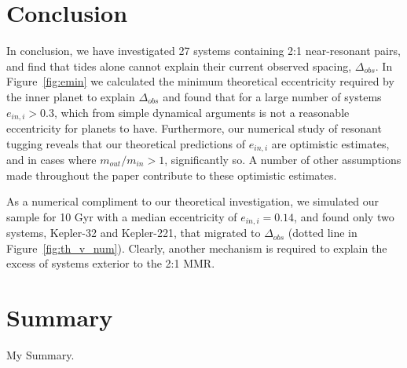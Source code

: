 \section{Conclusion}
\label{sec:Conclusion}
In conclusion, we have investigated 27 \kep{} systems containing 2:1 near-resonant pairs, and find that tides alone cannot explain their current observed spacing, $\Delta_{obs}$. 
In Figure~\ref{fig:emin} we calculated the minimum theoretical eccentricity required by the inner planet to explain $\Delta_{obs}$ and found that for a large number of systems $e_{in,i} > 0.3$, which from simple dynamical arguments is not a reasonable eccentricity for \kep{} planets to have.
Furthermore, our numerical study of resonant tugging reveals that our theoretical predictions of $e_{in,i}$ are optimistic estimates, and in cases where $m_{out}/m_{in} > 1$, significantly so.
A number of other assumptions made throughout the paper contribute to these optimistic estimates.

As a numerical compliment to our theoretical investigation, we simulated our \kep{} sample for 10 Gyr with a median eccentricity of $e_{in,i} = 0.14$, and found only two systems, Kepler-32 and Kepler-221, that migrated to $\Delta_{obs}$ (dotted line in Figure~\ref{fig:th_v_num}).
Clearly, another mechanism is required to explain the excess of \kep{} systems exterior to the 2:1 MMR. 

\section{Summary }

My Summary.
